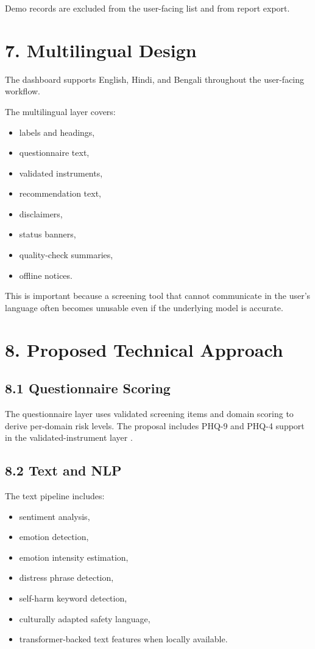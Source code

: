 \documentclass[11pt]{article}
\begin{document}
Demo records are excluded from the user-facing list and from report export.

\section{7. Multilingual Design}
The dashboard supports English, Hindi, and Bengali throughout the user-facing workflow.

The multilingual layer covers:
\begin{itemize}[leftmargin=*]
  \item labels and headings,
  \item questionnaire text,
  \item validated instruments,
  \item recommendation text,
  \item disclaimers,
  \item status banners,
  \item quality-check summaries,
  \item offline notices.
\end{itemize}

This is important because a screening tool that cannot communicate in the user’s language often becomes unusable even if the underlying model is accurate.

\section{8. Proposed Technical Approach}
\subsection{8.1 Questionnaire Scoring}
The questionnaire layer uses validated screening items and domain scoring to derive per-domain risk levels. The proposal includes PHQ-9 and PHQ-4 support in the validated-instrument layer \citep{kroenke2001phq9,kroenke2009phq4}.

\subsection{8.2 Text and NLP}
The text pipeline includes:
\begin{itemize}[leftmargin=*]
  \item sentiment analysis,
  \item emotion detection,
  \item emotion intensity estimation,
  \item distress phrase detection,
  \item self-harm keyword detection,
  \item culturally adapted safety language,
  \item transformer-backed text features when locally available.
\end{itemize}
\end{document}
